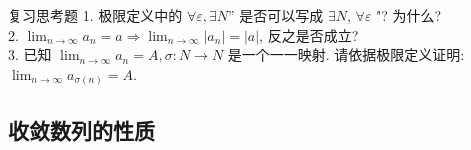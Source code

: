 \documentclass [t,12pt,mathserif] {beamer}
\begin{document}
\begin{frame}{ 复习思考题}%
1. 极限定义中的 $\forall \varepsilon, \exists N ”$ 是否可以写成 $\exists N$, $\forall \varepsilon$ "? 为什么?\\
2. $\lim _{n \rightarrow \infty} a_n=a \Rightarrow \lim _{n \rightarrow \infty}\left|a_n\right|=|a|$, 反之是否成立?\\
3. 已知 $\lim _{n \rightarrow \infty} a_n=A, \sigma: N \rightarrow N$ 是一个一一映射. 请依据极限定义证明: $\lim _{n \rightarrow \infty} a_{\sigma(n)}=A$.   
\end{frame}

\subsection{收敛数列的性质}

% 
% 
\end{document}
